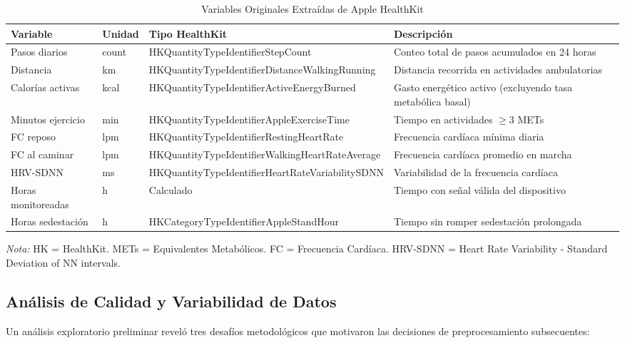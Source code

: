 \begin{table}[htbp]
\centering
\caption{Variables Originales Extraídas de Apple HealthKit}
\label{tab:variables_originales_apple_health}
\small
\begin{tabular}{@{}p{3.2cm}p{1.2cm}p{4cm}p{5cm}@{}}
\toprule
\textbf{Variable} & \textbf{Unidad} & \textbf{Tipo HealthKit} & \textbf{Descripción} \\
\midrule
Pasos diarios & count & HKQuantityTypeIdentifier\-StepCount & Conteo total de pasos acumulados en 24 horas \\
Distancia & km & HKQuantityTypeIdentifier\-DistanceWalkingRunning & Distancia recorrida en actividades ambulatorias \\
Calorías activas & kcal & HKQuantityTypeIdentifier\-ActiveEnergyBurned & Gasto energético activo (excluyendo tasa metabólica basal) \\
Minutos ejercicio & min & HKQuantityTypeIdentifier\-AppleExerciseTime & Tiempo en actividades $\geq$3 METs \\
FC reposo & lpm & HKQuantityTypeIdentifier\-RestingHeartRate & Frecuencia cardíaca mínima diaria \\
FC al caminar & lpm & HKQuantityTypeIdentifier\-WalkingHeartRateAverage & Frecuencia cardíaca promedio en marcha \\
HRV-SDNN & ms & HKQuantityTypeIdentifier\-HeartRateVariabilitySDNN & Variabilidad de la frecuencia cardíaca \\
Horas monitoreadas & h & Calculado & Tiempo con señal válida del dispositivo \\
Horas sedestación & h & HKCategoryTypeIdentifier\-AppleStandHour & Tiempo sin romper sedestación prolongada \\
\bottomrule
\end{tabular}
\begin{flushleft}
\scriptsize
\textit{Nota:} HK = HealthKit. METs = Equivalentes Metabólicos. FC = Frecuencia Cardíaca. HRV-SDNN = Heart Rate Variability - Standard Deviation of NN intervals.
\end{flushleft}
\end{table}

\subsection{Análisis de Calidad y Variabilidad de Datos}
\label{subsec:analisis_calidad_datos}

Un análisis exploratorio preliminar reveló tres desafíos metodológicos que motivaron las decisiones de preprocesamiento subsecuentes:


